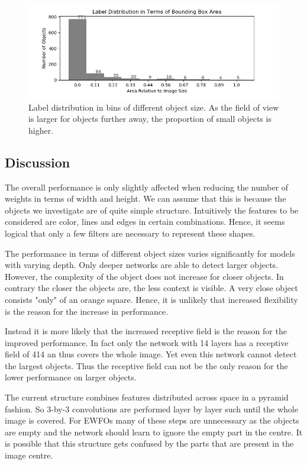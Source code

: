 	\begin{figure}[hbtp]
		\centering
		\includegraphics[width=\textwidth]{fig/distr_size}
		\caption{Label distribution in bins of different object size. As the field of view is larger for objects further away, the proportion of small objects is higher.}
		\label{fig:size_bins}
	\end{figure}
	
	\subsection{Discussion}
	
	The overall performance is only slightly affected when reducing the number of weights in terms of width and height. We can assume that this is because the objects we investigate are of quite simple structure. Intuitively the features to be considered are color, lines and edges in certain combinations. Hence, it seems logical that only a few filters are necessary to represent these shapes.
	
	The performance in terms of different object sizes varies significantly for models with varying depth. Only deeper networks are able to detect larger objects. However, the complexity of the object does not increase for closer objects. In contrary the closer the objects are, the less context is visible. A very close object consists "only" of an orange square. Hence, it is unlikely that increased flexibility is the reason for the increase in performance. 
	
	Instead it is more likely that the increased receptive field is the reason for the improved performance. In fact only the network with 14 layers has a receptive field of 414 an thus covers the whole image. Yet even this network cannot detect the largest objects. Thus the receptive field can not be the only reason for the lower performance on larger objects.
	
	 The current structure combines features distributed across space in a pyramid fashion. So 3-by-3 convolutions are performed layer by layer such until the whole image is covered. For \acp{EWFO} many of these steps are unnecessary as the objects are empty and the network should learn to ignore the empty part in the centre. It is possible that this structure gets confused by the parts that are present in the image centre.
	
